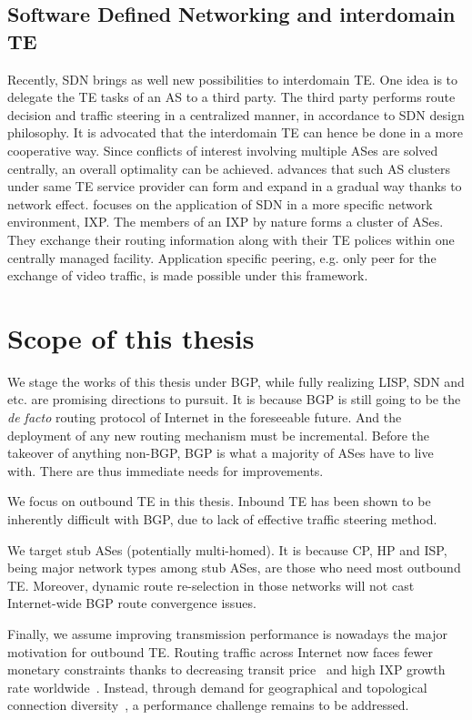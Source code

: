 \subsection{Software Defined Networking and interdomain TE}
Recently, \acf{SDN} brings as well new possibilities to interdomain TE. 
One idea is to delegate the TE tasks of an AS to a third party.
The third party performs route decision and traffic steering in a centralized manner, in accordance to \ac{SDN} design philosophy.
It is advocated that the interdomain TE can hence be done in a more cooperative way.
Since conflicts of interest involving multiple ASes are solved centrally, an overall optimality can be achieved.
\citet{Kotronis2012} advances that such AS clusters under same TE service provider can form and expand in a gradual way thanks to network effect.
\citet{Gupta2014} focuses on the application of \ac{SDN} in a more specific network environment, \ac{IXP}.
The members of an IXP by nature forms a cluster of ASes.
They exchange their routing information along with their TE polices within one centrally managed facility. 
Application specific peering, e.g. only peer for the exchange of video traffic, is made possible under this framework.

\section{Scope of this thesis}
We stage the works of this thesis under BGP, while fully realizing \ac{LISP}, \ac{SDN} and etc. are promising directions to pursuit.
It is because BGP is still going to be the \textit{de facto} routing protocol of Internet in the foreseeable future.
And the deployment of any new routing mechanism must be incremental.
Before the takeover of anything non-BGP,  BGP is what a majority of ASes have to live with. 
There are thus immediate needs for improvements.

We focus on outbound TE in this thesis.
Inbound TE has been shown to be inherently difficult with BGP, due to lack of effective traffic steering method.

We target stub ASes (potentially multi-homed).
It is because \ac{CP}, \ac{HP} and \ac{ISP}, being major network types among stub ASes, are those who need most outbound TE.
Moreover, dynamic route re-selection in those networks will not cast Internet-wide BGP route convergence issues.

Finally, we assume improving transmission performance is nowadays the major motivation for outbound TE.
Routing traffic across Internet now faces fewer monetary constraints thanks to decreasing transit price~\cite{transitprice, drpeering} and high \ac{IXP} growth rate worldwide~\cite{pchixp}.
Instead, through demand for geographical and topological connection diversity~\cite{Chiu2015}, a performance challenge remains to be addressed.

